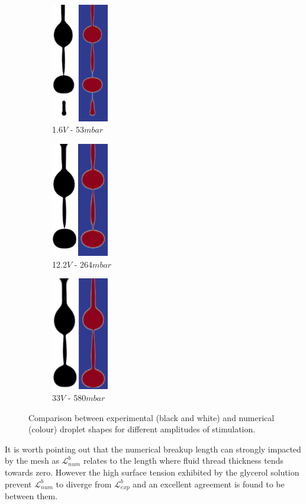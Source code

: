 \documentclass[onecolumn, 12pt]{asme2ej}
\begin{document}
\begin{figure}[h]
    \centering
    \begin{subfigure}{2.7cm}
        \centering
        \includegraphics[width=2.5cm]{Figures/Fig10a.eps}
        \caption{1.6$V$ - 53$mbar$}
    \end{subfigure}
    \hfill
    \begin{subfigure}{2.7cm}
        \centering
        \includegraphics[width=2.5cm]{Figures/Fig10b.eps}
        \caption{12.2$V$ - 264$mbar$}
    \end{subfigure}
    \hfill
    \begin{subfigure}{2.7cm}
        \centering
        \includegraphics[width=2.5cm]{Figures/Fig10c.eps}
        \caption{33$V$ - 580$mbar$}
    \end{subfigure}
       \caption{Comparison between experimental (black and white) and numerical (colour) droplet shapes for different amplitudes of stimulation.}
       \label{fig:glycerolDrop}
\end{figure}
It is worth pointing out that the numerical breakup length can strongly impacted by the mesh as $\mathcal{L}_{num}^b$ relates to the length where fluid thread thickness tends towards zero. However the high surface tension exhibited by the glycerol solution prevent $\mathcal{L}_{num}^b$ to diverge from $\mathcal{L}_{exp}^b$ and an excellent agreement is found to be between them. 
\end{document}

